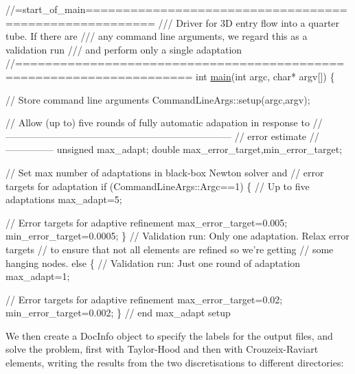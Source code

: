 \begin{DoxyCodeInclude}
\textcolor{comment}{//=start\_of\_main=======================================================}
\textcolor{comment}{/// Driver for 3D entry flow into a quarter tube. If there are}
\textcolor{comment}{}\textcolor{comment}{/// any command line arguments, we regard this as a validation run}
\textcolor{comment}{}\textcolor{comment}{/// and perform only a single adaptation}
\textcolor{comment}{}\textcolor{comment}{//=====================================================================}
\textcolor{keywordtype}{int} \hyperlink{full__tube_8cc_a0ddf1224851353fc92bfbff6f499fa97}{main}(\textcolor{keywordtype}{int} argc, \textcolor{keywordtype}{char}* argv[]) 
\{

 \textcolor{comment}{// Store command line arguments}
 CommandLineArgs::setup(argc,argv);

 \textcolor{comment}{// Allow (up to) five rounds of fully automatic adapation in response to }
 \textcolor{comment}{//-----------------------------------------------------------------------}
 \textcolor{comment}{// error estimate}
 \textcolor{comment}{//---------------}
 \textcolor{keywordtype}{unsigned} max\_adapt;
 \textcolor{keywordtype}{double} max\_error\_target,min\_error\_target;

 \textcolor{comment}{// Set max number of adaptations in black-box Newton solver and}
 \textcolor{comment}{// error targets for adaptation}
 \textcolor{keywordflow}{if} (CommandLineArgs::Argc==1)
  \{
   \textcolor{comment}{// Up to five adaptations}
   max\_adapt=5;

   \textcolor{comment}{// Error targets for adaptive refinement}
   max\_error\_target=0.005;
   min\_error\_target=0.0005;
  \} 
 \textcolor{comment}{// Validation run: Only one adaptation. Relax error targets}
 \textcolor{comment}{// to ensure that not all elements are refined so we're getting}
 \textcolor{comment}{// some hanging nodes.}
 \textcolor{keywordflow}{else}
  \{
   \textcolor{comment}{// Validation run: Just one round of adaptation}
   max\_adapt=1;
   
   \textcolor{comment}{// Error targets for adaptive refinement}
   max\_error\_target=0.02;
   min\_error\_target=0.002;
  \}
 \textcolor{comment}{// end max\_adapt setup}

\end{DoxyCodeInclude}


We then create a {\ttfamily Doc\+Info} object to specify the labels for the output files, and solve the problem, first with Taylor-\/\+Hood and then with Crouzeix-\/\+Raviart elements, writing the results from the two discretisations to different directories\+:


